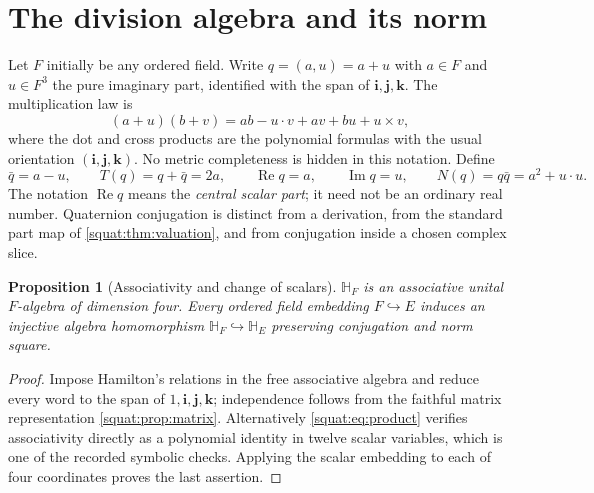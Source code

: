 \documentclass[11pt,letterpaper]{article}
\numberwithin{equation}{section}
\newtheorem{proposition}[proposition]{Proposition}
\theoremstyle{definition}
\theoremstyle{remark}
\newcommand{\HF}{\mathbb H_F}
\newcommand{\ii}{\mathbf i}
\newcommand{\jj}{\mathbf j}
\newcommand{\kk}{\mathbf k}
\newcommand{\Rea}{\operatorname{Re}}
\newcommand{\Ima}{\operatorname{Im}}
\begin{document}
\section{The division algebra and its norm}\label{squat:sec:algebra}

Let $F$ initially be any ordered field. Write $q=(a,u)=a+u$ with $a\in F$ and
$u\in F^3$ the pure imaginary part, identified with the span of $\ii,\jj,\kk$. The
multiplication law is
\begin{equation}\label{squat:eq:product}
 (a+u)(b+v)=ab-u\cdot v+av+bu+u\times v,
\end{equation}
where the dot and cross products are the polynomial formulas with the usual orientation
$(\ii,\jj,\kk)$. No metric completeness is hidden in this notation. Define
\[
 \bar q=a-u,\qquad T(q)=q+\bar q=2a,\qquad
 \Rea q=a,\qquad \Ima q=u,\qquad
 N(q)=q\bar q=a^2+u\cdot u .
\]
The notation $\Rea q$ means the \emph{central scalar part}; it need not be an ordinary
real number. Quaternion conjugation is distinct from a derivation, from the standard part
map of \cref{squat:thm:valuation}, and from conjugation inside a chosen complex slice.

\begin{proposition}[Associativity and change of scalars]\label{squat:prop:assoc}
$\HF$ is an associative unital $F$-algebra of dimension four. Every ordered field
embedding $F\hookrightarrow E$ induces an injective algebra homomorphism
$\HF\hookrightarrow\mathbb H_E$ preserving conjugation and norm square.
\end{proposition}
\begin{proof}
Impose Hamilton's relations in the free associative algebra and reduce every word to the
span of $1,\ii,\jj,\kk$; independence follows from the faithful matrix representation
\cref{squat:prop:matrix}. Alternatively \cref{squat:eq:product} verifies associativity
directly as a polynomial identity in twelve scalar variables, which is one of the
recorded symbolic checks. Applying the scalar embedding to each of four coordinates
proves the last assertion.
\end{proof}
\end{document}
